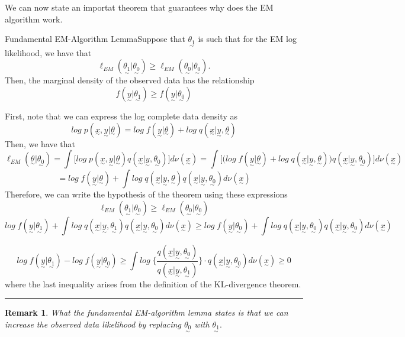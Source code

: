 \documentclass[twoside]{article}
\newtheorem{remark}[theorem]{Remark}
\newenvironment{proof}{{\bf Proof:}}{\hfill\rule{2mm}{2mm}}
\newcommand{\utilde}{\underset{\sim}}
\begin{document}
We can now state an importat theorem that guarantees why does the EM algorithm work.

\begin{theorem_exam}{Fundamental EM-Algorithm Lemma}{}Suppose that $\utilde{\theta_1}$ is such that for the EM log likelihood, we have that 
$$
\ell_{EM}(\utilde{\theta_1}|\utilde{\theta_0}) \geq \ell_{EM}(\utilde{\theta_0}|\utilde{\theta_0}).
$$
Then, the marginal density of the observed data has the relationship
$$
f(\utilde{y}|\utilde{\theta_1}) \geq f(\utilde{y}|\utilde{\theta_0})
$$
\end{theorem_exam}

\begin{proof} First, note that we can express the log complete data density as  
$$
log\;p(\utilde{x}, \utilde{y}|\utilde{\theta}) = log\;f(\utilde{y}|\utilde{\theta}) + log\;q(\utilde{x}|\utilde{y},\utilde{\theta})
$$
Then, we have that 
$$
\ell_{EM}(\utilde{\theta}|\utilde{\theta_0}) = \int \bigg[log\;p(\utilde{x},\utilde{y}|\utilde{\theta})q(\utilde{x}|\utilde{y}, \utilde{\theta_0}) \bigg]d\nu(\utilde{x}) = \int \bigg[\big(log\;f(\utilde{y}|\utilde{\theta}) + log\;q(\utilde{x}|\utilde{y},\utilde{\theta}) \big) q(\utilde{x}|\utilde{y}, \utilde{\theta_0}) \bigg]d\nu(\utilde{x})
$$
$$
= log\;f(\utilde{y}|\utilde{\theta}) + \int log\;q(\utilde{x}|\utilde{y}, \utilde{\theta})q(\utilde{x}|\utilde{y}, \utilde{\theta_0})d\nu(\utilde{x})
$$
Therefore, we can write the hypothesis of the theorem using these expressions 
$$
\ell_{EM}(\utilde{\theta_1}|\utilde{\theta_0}) \geq \ell_{EM}(\utilde{\theta_0}|\utilde{\theta_0})
$$
$$
log\;f(\utilde{y}|\utilde{\theta_1}) + \int log\;q(\utilde{x}|\utilde{y}, \utilde{\theta_1})q(\utilde{x}|\utilde{y}, \utilde{\theta_0})d\nu(\utilde{x}) \geq log\;f(\utilde{y}|\utilde{\theta_0}) + \int log\;q(\utilde{x}|\utilde{y}, \utilde{\theta_0})q(\utilde{x}|\utilde{y}, \utilde{\theta_0})d\nu(\utilde{x})
$$

$$
log\;f(\utilde{y}|\utilde{\theta_1}) - log\;f(\utilde{y}|\utilde{\theta_0}) \geq \int log\;\bigg\{ \frac{q(\utilde{x}|\utilde{y}, \utilde{\theta_0})}{q(\utilde{x}|\utilde{y}, \utilde{\theta_1})} \bigg\}\cdot q(\utilde{x}|\utilde{y}, \utilde{\theta_0})d\nu(\utilde{x}) \geq 0
$$
where the last inequality arises from the definition of the KL-divergence theorem.
\end{proof}

\begin{remark}What the fundamental EM-algorithm lemma states is that we can increase the observed data likelihood by replacing $\utilde{\theta_0}$ with $\utilde{\theta_1}.$
\end{remark}
\end{document}
